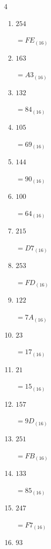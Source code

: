 \begin{multicols}{4}
\begin{enumerate}
        $=22_{(16)}$

  \item $254$

        $=FE_{(16)}$

  \item $163$

        $=A3_{(16)}$

  \item $132$

        $=84_{(16)}$

  \item $105$

        $=69_{(16)}$

  \item $144$

        $=90_{(16)}$

  \item $100$

        $=64_{(16)}$

  \item $215$

        $=D7_{(16)}$

  \item $253$

        $=FD_{(16)}$

  \item $122$

        $=7A_{(16)}$

  \item $23$

        $=17_{(16)}$

  \item $21$

        $=15_{(16)}$

  \item $157$

        $=9D_{(16)}$

  \item $251$

        $=FB_{(16)}$

  \item $133$

        $=85_{(16)}$

\columnbreak %

\resetques

  \item $247$

        $=F7_{(16)}$

  \item $93$


\end{enumerate}
\end{multicols}
